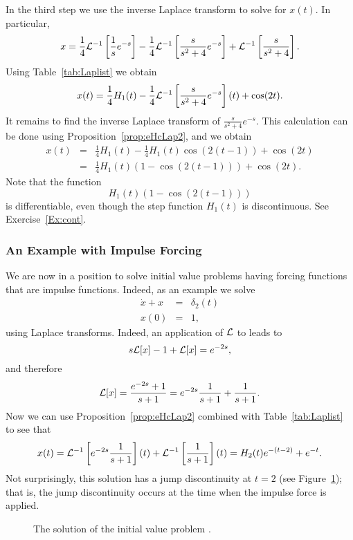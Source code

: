 In the third step we use the inverse Laplace transform to solve for $x(t)$. 
In particular,
\[
x = \frac{1}{4}{\cal L}^{-1}\left[\frac{1}{s}e^{-s}\right] - 
\frac{1}{4}{\cal L}^{-1}\left[\frac{s}{s^2+4}e^{-s}\right] + 
{\cal L}^{-1}\left[\frac{s}{s^2+4}\right].
\]
Using Table~\ref{tab:Laplist} we obtain
\[
x(t) = \frac{1}{4}H_1(t) - 
\frac{1}{4}{\cal L}^{-1}\left[\frac{s}{s^2+4}e^{-s}\right](t) + \cos(2t).
\]
It remains to find the inverse Laplace transform of $\frac{s}{s^2+4}e^{-s}$.  
This calculation can be done using Proposition~\ref{prop:eHcLap2}, and we 
obtain
\begin{eqnarray*}
x(t) & = & \frac{1}{4}H_1(t) - \frac{1}{4}H_1(t)\cos(2(t-1)) + \cos(2t) \\
& = & \frac{1}{4}H_1(t)(1-\cos(2(t-1))) + \cos(2t).
\end{eqnarray*}
Note that the function 
\[
H_1(t)(1-\cos(2(t-1)))
\]
is differentiable, even though the step function $H_1(t)$ is discontinuous.
See Exercise~\ref{Ex:cont}.

\subsubsection*{An Example with Impulse Forcing}

We are now in a position to solve initial value problems having forcing 
functions that are impulse functions.   Indeed, as an example we solve
\begin{equation}  \label{eq:delta1}
\begin{array}{rcl}
\dot x + x & = & \delta_2(t)\\
x(0) & = & 1,
\end{array}
\end{equation}
using Laplace transforms.  Indeed, an application of ${\cal L}$ to
 leads to
\[
s{\cal L}[x]-1 + {\cal L}[x] = e^{-2s},
\]
and therefore
\[
{\cal L}[x]=\frac{e^{-2s}+1}{s+1}=e^{-2s}\frac{1}{s+1}+\frac{1}{s+1}.
\]
Now we can use Proposition~\ref{prop:eHcLap2} combined with 
Table~\ref{tab:Laplist} to see that
\[
x(t) = {\cal L}^{-1}\left[e^{-2s}\frac{1}{s+1}\right](t)+ 
{\cal L}^{-1}\left[\frac{1}{s+1}\right](t) = 
H_2(t)e^{-(t-2)} + e^{-t}.
\]
Not surprisingly, this solution has a jump discontinuity at $t=2$ (see 
Figure~\ref{fig:delta1sol}); that is, the jump discontinuity occurs at 
the time when the impulse force is applied.
\begin{figure}[htb]
           \centerline{%
           }
           \caption{The solution of the initial value problem
	   \protect{}.}
           \label{fig:delta1sol}
\end{figure}


